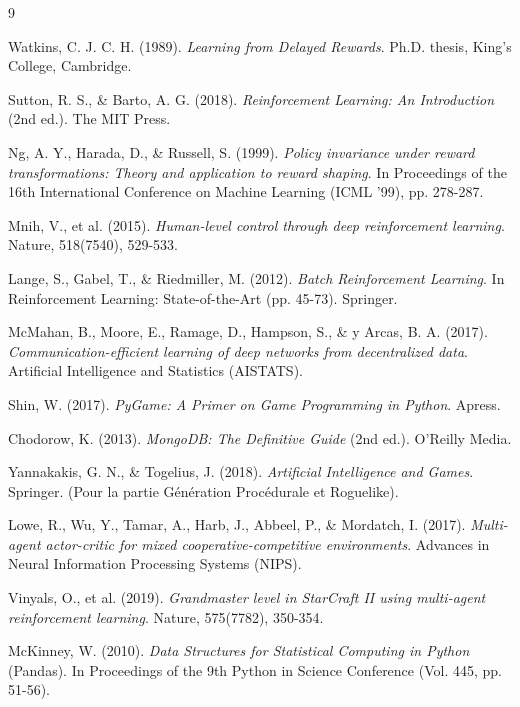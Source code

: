 \documentclass[12pt,a4paper]{article}
\begin{document}
\begin{thebibliography}{9}

Watkins, C. J. C. H. (1989).
\textit{Learning from Delayed Rewards}.
Ph.D. thesis, King's College, Cambridge.

Sutton, R. S., \& Barto, A. G. (2018).
\textit{Reinforcement Learning: An Introduction} (2nd ed.).
The MIT Press.

Ng, A. Y., Harada, D., \& Russell, S. (1999).
\textit{Policy invariance under reward transformations: Theory and application to reward shaping}.
In Proceedings of the 16th International Conference on Machine Learning (ICML '99), pp. 278-287.

Mnih, V., et al. (2015).
\textit{Human-level control through deep reinforcement learning}.
Nature, 518(7540), 529-533.

Lange, S., Gabel, T., \& Riedmiller, M. (2012).
\textit{Batch Reinforcement Learning}.
In Reinforcement Learning: State-of-the-Art (pp. 45-73). Springer.

McMahan, B., Moore, E., Ramage, D., Hampson, S., \& y Arcas, B. A. (2017).
\textit{Communication-efficient learning of deep networks from decentralized data}.
Artificial Intelligence and Statistics (AISTATS).

Shin, W. (2017).
\textit{PyGame: A Primer on Game Programming in Python}.
Apress.

Chodorow, K. (2013).
\textit{MongoDB: The Definitive Guide} (2nd ed.).
O'Reilly Media.

Yannakakis, G. N., \& Togelius, J. (2018).
\textit{Artificial Intelligence and Games}.
Springer. (Pour la partie Génération Procédurale et Roguelike).

Lowe, R., Wu, Y., Tamar, A., Harb, J., Abbeel, P., \& Mordatch, I. (2017).
\textit{Multi-agent actor-critic for mixed cooperative-competitive environments}.
Advances in Neural Information Processing Systems (NIPS).

Vinyals, O., et al. (2019).
\textit{Grandmaster level in StarCraft II using multi-agent reinforcement learning}.
Nature, 575(7782), 350-354.

McKinney, W. (2010).
\textit{Data Structures for Statistical Computing in Python} (Pandas).
In Proceedings of the 9th Python in Science Conference (Vol. 445, pp. 51-56).

\end{thebibliography}
\end{document}
